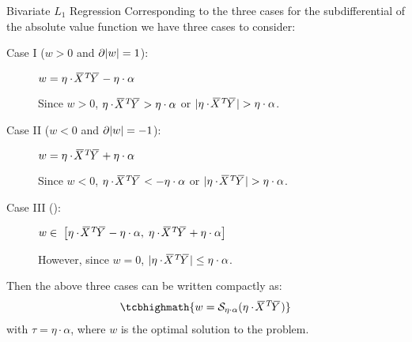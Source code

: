 \begin{frame}{Bivariate $L_1$ Regression}
Corresponding to the three cases for the subdifferential of the absolute
value function 
we have three cases to consider: 
\begin{description}
    
    \item[Case I ($w>0$ and $\partial\abs{w} = 1$):]%
$ w   = \eta \cdot \mX^T \mY - \eta \cdot \alpha $ 

    Since $w > 0$, $\eta \cdot \mX^T \mY > \eta \cdot \alpha$ or $|\eta \cdot \mX^T\mY| > \eta \cdot \alpha$.

\item[Case II ($w<0$ and $\partial\abs{w} = -1$):]%
        $w  = \eta \cdot \mX^T \mY + \eta \cdot \alpha$ 

    Since $w < 0$, 
    $\eta \cdot \mX^T \mY < - \eta \cdot \alpha$ or 
    $|\eta \cdot \mX^T \mY | > \eta \cdot \alpha$.

\item[Case III ():]
$        w  \in\; \lB[\eta \cdot \mX^T \mY - \eta \cdot \alpha, \; \eta \cdot \mX^T\mY + \eta \cdot \alpha\rB] $

    However, since $w=0$,
    $| \eta \cdot \mX^T \mY | \le \eta \cdot \alpha$. 

\end{description}
%
Then the above three cases can be written compactly as:
\begin{align*}
    \tcbhighmath{
    w = \cS_{\eta \cdot \alpha}(\eta \cdot \mX^T \mY)}
\end{align*}
with $\tau = \eta \cdot \alpha$, where $w$ is the optimal solution to the
problem. %
\end{frame}
%

